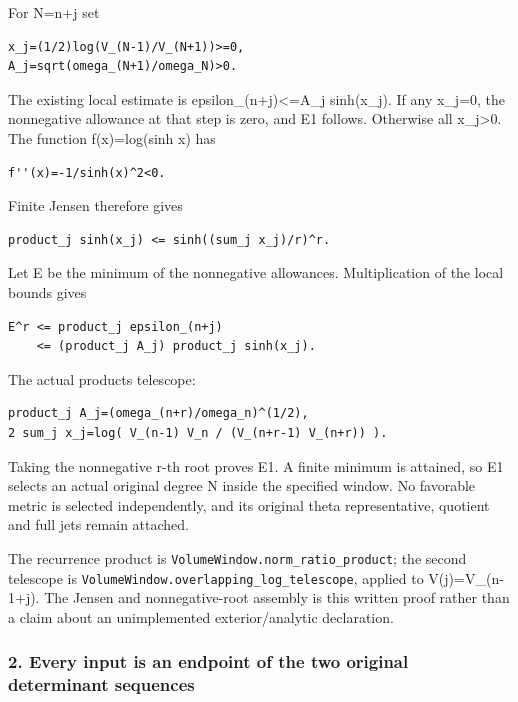 For N=n+j set

\begin{verbatim}
x_j=(1/2)log(V_(N-1)/V_(N+1))>=0,
A_j=sqrt(omega_(N+1)/omega_N)>0.
\end{verbatim}

The existing local estimate is epsilon\_(n+j)\textless=A\_j sinh(x\_j). If any x\_j=0, the nonnegative allowance at that step is zero, and E1 follows. Otherwise all x\_j\textgreater0. The function f(x)=log(sinh x) has

\begin{verbatim}
f''(x)=-1/sinh(x)^2<0.
\end{verbatim}

Finite Jensen therefore gives

\begin{verbatim}
product_j sinh(x_j) <= sinh((sum_j x_j)/r)^r.
\end{verbatim}

Let E be the minimum of the nonnegative allowances. Multiplication of the local bounds gives

\begin{verbatim}
E^r <= product_j epsilon_(n+j)
    <= (product_j A_j) product_j sinh(x_j).
\end{verbatim}

The actual products telescope:

\begin{verbatim}
product_j A_j=(omega_(n+r)/omega_n)^(1/2),
2 sum_j x_j=log( V_(n-1) V_n / (V_(n+r-1) V_(n+r)) ).
\end{verbatim}

Taking the nonnegative r-th root proves E1. A finite minimum is attained, so E1 selects an actual original degree N inside the specified window. No favorable metric is selected independently, and its original theta representative, quotient and full jets remain attached.

The recurrence product is \nolinkurl{VolumeWindow.norm_ratio_product}; the second telescope is \nolinkurl{VolumeWindow.overlapping_log_telescope}, applied to V(j)=V\_(n-1+j). The Jensen and nonnegative-root assembly is this written proof rather than a claim about an unimplemented exterior/analytic declaration.

\subsubsection{2. Every input is an endpoint of the two original determinant sequences}\label{endpoint-pr23_corrected--every-input-is-an-endpoint-of-the-two-original-determinant-sequences}

